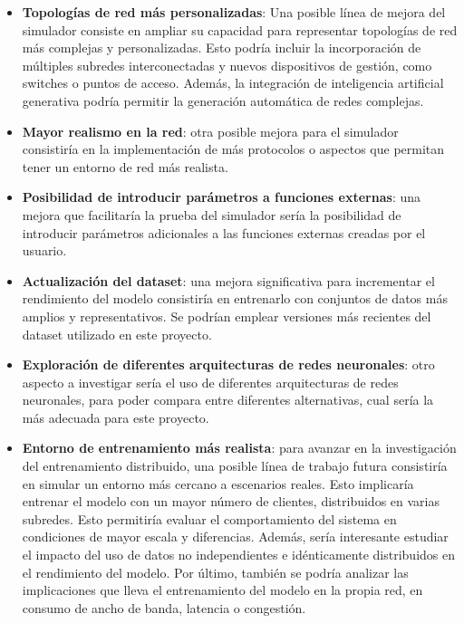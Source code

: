 \begin{itemize}
    \item \textbf{Topologías de red más personalizadas}: Una posible línea de mejora del simulador consiste en ampliar su capacidad para representar topologías de red más complejas y personalizadas. Esto podría incluir la incorporación de múltiples subredes interconectadas y nuevos dispositivos de gestión, como switches o puntos de acceso. Además, la integración de inteligencia artificial generativa podría permitir la generación automática de redes complejas.
    \item \textbf{Mayor realismo en la red}: otra posible mejora para el simulador consistiría en la implementación de más protocolos o aspectos que permitan tener un entorno de red más realista.
    \item \textbf{Posibilidad de introducir parámetros a funciones externas}: una mejora que facilitaría la prueba del simulador sería la posibilidad de introducir parámetros adicionales a las funciones externas creadas por el usuario.
    \item \textbf{Actualización del dataset}: una mejora significativa para incrementar el rendimiento del modelo consistiría en entrenarlo con conjuntos de datos más amplios y representativos. Se podrían emplear versiones más recientes del dataset utilizado en este proyecto.
    \item \textbf{Exploración de diferentes arquitecturas de redes neuronales}: otro aspecto a investigar sería el uso de diferentes arquitecturas de redes neuronales, para poder compara entre diferentes alternativas, cual sería la más adecuada para este proyecto.
    \item \textbf{Entorno de entrenamiento más realista}: para avanzar en la investigación del entrenamiento distribuido, una posible línea de trabajo futura consistiría en simular un entorno más cercano a escenarios reales. Esto implicaría entrenar el modelo con un mayor número de clientes, distribuidos en varias subredes. Esto permitiría evaluar el comportamiento del sistema en condiciones de mayor escala y diferencias. Además, sería interesante estudiar el impacto del uso de datos no independientes e idénticamente distribuidos en el rendimiento del modelo. Por último, también se podría analizar las implicaciones que lleva el entrenamiento del modelo en la propia red, en consumo de ancho de banda, latencia o congestión.
\end{itemize}